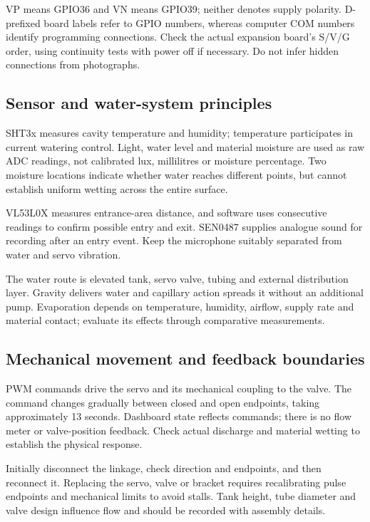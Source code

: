 \documentclass[10pt,a4paper]{article}
\begin{document}
VP means GPIO36 and VN means GPIO39; neither denotes supply polarity. D-prefixed board labels refer to GPIO numbers, whereas computer COM numbers identify programming connections. Check the actual expansion board's S/V/G order, using continuity tests with power off if necessary. Do not infer hidden connections from photographs.




\subsection{Sensor and water-system principles}

SHT3x measures cavity temperature and humidity; temperature participates in current watering control. Light, water level and material moisture are used as raw ADC readings, not calibrated lux, millilitres or moisture percentage. Two moisture locations indicate whether water reaches different points, but cannot establish uniform wetting across the entire surface.


VL53L0X measures entrance-area distance, and software uses consecutive readings to confirm possible entry and exit. SEN0487 supplies analogue sound for recording after an entry event. Keep the microphone suitably separated from water and servo vibration.


The water route is elevated tank, servo valve, tubing and external distribution layer. Gravity delivers water and capillary action spreads it without an additional pump. Evaporation depends on temperature, humidity, airflow, supply rate and material contact; evaluate its effects through comparative measurements.


\subsection{Mechanical movement and feedback boundaries}

PWM commands drive the servo and its mechanical coupling to the valve. The command changes gradually between closed and open endpoints, taking approximately 13 seconds. Dashboard state reflects commands; there is no flow meter or valve-position feedback. Check actual discharge and material wetting to establish the physical response.


Initially disconnect the linkage, check direction and endpoints, and then reconnect it. Replacing the servo, valve or bracket requires recalibrating pulse endpoints and mechanical limits to avoid stalls. Tank height, tube diameter and valve design influence flow and should be recorded with assembly details.
\end{document}

